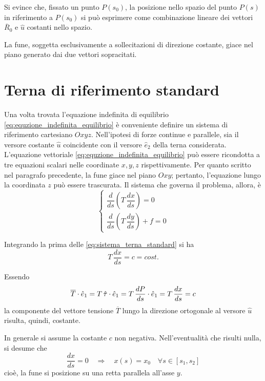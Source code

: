 Si evince che, fissato un punto $P(s_0)$, la posizione nello spazio del punto $P(s)$ in riferimento a $P(s_0)$ si può esprimere come combinazione lineare dei vettori $\overline{R}_0$ e $\hat{u}$ costanti nello spazio.

La fune, soggetta esclusivamente a sollecitazioni di direzione costante, giace nel piano generato dai due vettori sopracitati.

\section{Terna di riferimento standard}
Una volta trovata l'equazione indefinita di equilibrio \eqref{eq:equzione_indefinita_equilibrio} è conveniente definire un sistema di riferimento cartesiano $Oxyz$. Nell'ipotesi di forze continue e parallele, sia il versore costante $\hat{u}$ coincidente con il versore $\hat{e}_2$ della terna considerata. 
L'equazione vettoriale \eqref{eq:equzione_indefinita_equilibrio} può essere ricondotta a tre equazioni scalari nelle coordinate $x, y, z$ rispettivamente. Per quanto scritto nel paragrafo precedente, la fune giace nel piano $Oxy$; pertanto, l'equazione lungo la coordinata $z$ può essere trascurata. Il sistema che governa il problema, allora, è
\begin{equation}
	\label{eq:sistema_terna_standard}
	\begin{cases}
		\dfrac{d}{ds}\left(T\,\dfrac{dx}{ds}\right) = 0\\[1.5ex]
		\dfrac{d}{ds}\left(T\,\dfrac{dy}{ds}\right) + f = 0
	\end{cases}
\end{equation}

Integrando la prima delle \eqref{eq:sistema_terna_standard} si ha
\begin{equation}
	\label{eq:tensione_direzione_x}
T\,\dfrac{dx}{ds} = c = cost.	
\end{equation}

Essendo
\[
\overline{T}\cdot\hat{e}_1	= T\,\hat{\tau}\cdot \hat{e}_1 = T\,\dfrac{dP}{ds}\cdot\hat{e}_1 = T\,\dfrac{dx}{ds} = c
\]
la componente del vettore tensione $\overline{T}$ lungo la direzione ortogonale al versore $\hat{u}$ risulta, quindi, costante. 

In generale si assume la costante $c$ non negativa. Nell'eventualità che risulti nulla, si desume che 
\[
\dfrac{dx}{ds} = 0	\quad \Longrightarrow \quad x(s) = x_0\quad \forall s\in[s_1, s_2]
\]  
cioè, la fune si posizione su una retta parallela all'asse $y$.

